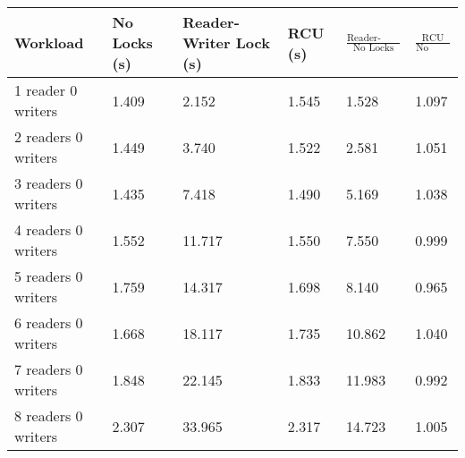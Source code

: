 \begin{tabular}{|l|p{1.5cm}|p{1.5cm}|p{1cm}|l|l|}
\hline Workload &No Locks (s) &Reader-Writer Lock (s) & RCU (s) & $\frac{\mbox{Reader-Writer Lock}}{\mbox{No Locks}}$ & $\frac{\mbox{RCU}}{\mbox{No Locks}}$ \\
\hline 1 reader 0 writers & 1.409 & 2.152 & 1.545&1.528&1.097\\
\hline 2 readers 0 writers & 1.449 & 3.740 & 1.522&2.581&1.051\\
\hline 3 readers 0 writers & 1.435 & 7.418 & 1.490&5.169&1.038\\
\hline 4 readers 0 writers & 1.552 & 11.717 & 1.550&7.550&0.999\\
\hline 5 readers 0 writers & 1.759 & 14.317 & 1.698&8.140&0.965\\
\hline 6 readers 0 writers & 1.668 & 18.117 & 1.735&10.862&1.040\\
\hline 7 readers 0 writers & 1.848 & 22.145 & 1.833&11.983&0.992\\
\hline 8 readers 0 writers & 2.307 & 33.965 & 2.317&14.723&1.005\\
\hline
\end{tabular}
